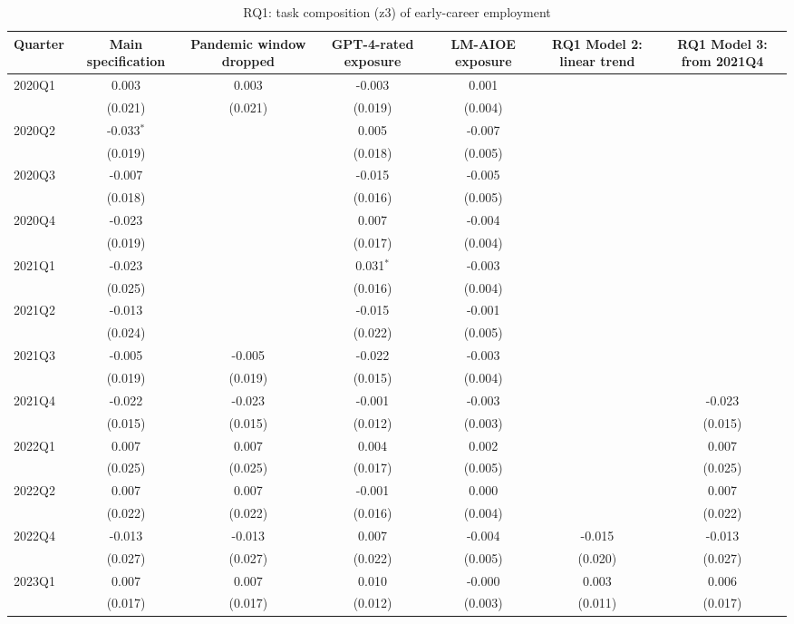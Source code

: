 \begin{table}[htbp]\centering
\caption{RQ1: task composition (z3) of early-career employment}
\begin{tabular}{lcccccc}
\toprule
Quarter & Main specification & Pandemic window dropped & GPT-4-rated exposure & LM-AIOE exposure & RQ1 Model 2: linear trend & RQ1 Model 3: from 2021Q4 \\
\midrule
2020Q1 & 0.003 & 0.003 & -0.003 & 0.001 &  &  \\
 & (0.021) & (0.021) & (0.019) & (0.004) &  &  \\
2020Q2 & -0.033$^{*}$ &  & 0.005 & -0.007 &  &  \\
 & (0.019) &  & (0.018) & (0.005) &  &  \\
2020Q3 & -0.007 &  & -0.015 & -0.005 &  &  \\
 & (0.018) &  & (0.016) & (0.005) &  &  \\
2020Q4 & -0.023 &  & 0.007 & -0.004 &  &  \\
 & (0.019) &  & (0.017) & (0.004) &  &  \\
2021Q1 & -0.023 &  & 0.031$^{*}$ & -0.003 &  &  \\
 & (0.025) &  & (0.016) & (0.004) &  &  \\
2021Q2 & -0.013 &  & -0.015 & -0.001 &  &  \\
 & (0.024) &  & (0.022) & (0.005) &  &  \\
2021Q3 & -0.005 & -0.005 & -0.022 & -0.003 &  &  \\
 & (0.019) & (0.019) & (0.015) & (0.004) &  &  \\
2021Q4 & -0.022 & -0.023 & -0.001 & -0.003 &  & -0.023 \\
 & (0.015) & (0.015) & (0.012) & (0.003) &  & (0.015) \\
2022Q1 & 0.007 & 0.007 & 0.004 & 0.002 &  & 0.007 \\
 & (0.025) & (0.025) & (0.017) & (0.005) &  & (0.025) \\
2022Q2 & 0.007 & 0.007 & -0.001 & 0.000 &  & 0.007 \\
 & (0.022) & (0.022) & (0.016) & (0.004) &  & (0.022) \\
2022Q4 & -0.013 & -0.013 & 0.007 & -0.004 & -0.015 & -0.013 \\
 & (0.027) & (0.027) & (0.022) & (0.005) & (0.020) & (0.027) \\
2023Q1 & 0.007 & 0.007 & 0.010 & -0.000 & 0.003 & 0.006 \\
 & (0.017) & (0.017) & (0.012) & (0.003) & (0.011) & (0.017) \\

\end{tabular}
\end{table}
